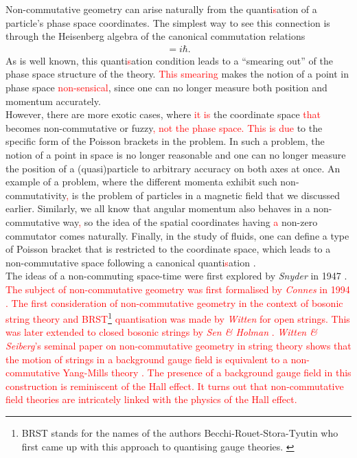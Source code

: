     Non-commutative geometry can arise naturally from the quanti\textcolor{red}{s}ation of a particle's phase space coordinates. The simplest way to see this connection is through the Heisenberg algebra of the canonical commutation relations
    \begin{align}
        [\hat{x}, \hat{p}] = i \hbar.
    \end{align}
    As is well known, this quanti\textcolor{red}{s}ation condition leads to a ``smearing out'' of the phase space structure of the theory. \textcolor{red}{This smearing} makes \colorbox{red}{ } the notion of a point in phase space \textcolor{red}{non-sensical}, since one can no longer measure both position and momentum accurately. \\
    \indent However, there are more exotic cases, where \textcolor{red}{it is} the coordinate space \textcolor{red}{that} becomes non-commutative or fuzzy\textcolor{red}{, not the phase space.} \textcolor{red}{This is due} to the specific form of the Poisson brackets in the problem. In such a problem, the notion of a point in space is no longer reasonable and one can no longer measure the position of a (quasi)particle to arbitrary accuracy on both axes at once. An example of a problem, where the different momenta exhibit such non-commutativity\textcolor{red}{,} is the problem of particles in a magnetic field that we discussed earlier. Similarly, we all know that angular momentum also behaves in a non-commutative way\textcolor{red}{,} so the idea of the spatial coordinates having \textcolor{red}{a} non-zero commutator comes naturally. Finally, in the study of fluids, one can define a type of Poisson bracket that is restricted to the coordinate space, which leads to a non-commutative space following a canonical quanti\textcolor{red}{s}ation \cite{Jackiw:2002pn}. \\
    \indent The ideas of a non-commuting space-time were first explored by \textit{Snyder} in 1947 \cite{Snyder:1946qz, Snyder:1947nq}. \textcolor{red}{The subject of non-commutative geometry was first formalised by \textit{Connes} in 1994 \cite{Connes:1994yd}. The first consideration of non-commutative geometry in the context of bosonic string theory and BRST\footnote{BRST stands for the names of the authors Becchi-Rouet-Stora-Tyutin who first came up with this approach to quantising gauge theories. \cite{Tyutin:1975qk, Becchi:1974xu, Becchi:1975nq}  } quantisation was made by \textit{Witten} \cite{Witten:1985cc} for open strings. This was later extended to closed bosonic strings by \textit{Sen \& Holman}  \cite{Sen:1986bh}. \textit{Witten \& Seiberg}'s seminal paper on non-commutative geometry in string theory shows that the motion of strings in a background gauge field is equivalent to a non-commutative Yang-Mills theory \cite{Seiberg:1999vs}. The presence of a background gauge field in this construction is reminiscent of the Hall effect. It turns out that non-commutative field theories are intricately linked with the physics of the Hall effect. }\\

